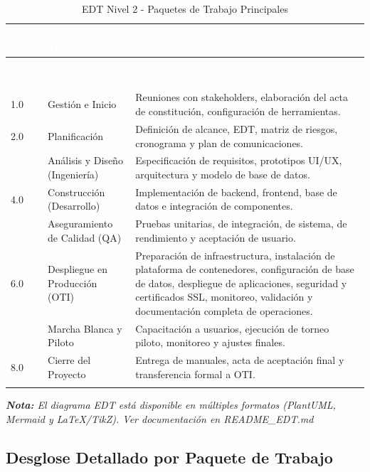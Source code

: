 \documentclass[12pt,a4paper]{article}
\begin{document}
\begin{longtable}{|>{\centering\arraybackslash}p{1.5cm}|>{\raggedright\arraybackslash}p{5cm}|>{\raggedright\arraybackslash}p{8cm}|}
\hline
\rowcolor{headercolor}
\textcolor{white}{\textbf{ID EDT}} & \textcolor{white}{\textbf{Paquete de Trabajo}} & \textcolor{white}{\textbf{Descripción}} \\
\hline
\endfirsthead
\hline
\rowcolor{headercolor}
\textcolor{white}{\textbf{ID EDT}} & \textcolor{white}{\textbf{Paquete de Trabajo}} & \textcolor{white}{\textbf{Descripción}} \\
\hline
\endhead
\hline
\endlastfoot

1.0 & Gestión e Inicio & Reuniones con stakeholders, elaboración del acta de constitución, configuración de herramientas. \\
\hline
\rowcolor{rowgray}
2.0 & Planificación & Definición de alcance, EDT, matriz de riesgos, cronograma y plan de comunicaciones. \\
\hline
3.0 & Análisis y Diseño (Ingeniería) & Especificación de requisitos, prototipos UI/UX, arquitectura y modelo de base de datos. \\
\hline
\rowcolor{rowgray}
4.0 & Construcción (Desarrollo) & Implementación de backend, frontend, base de datos e integración de componentes. \\
\hline
5.0 & Aseguramiento de Calidad (QA) & Pruebas unitarias, de integración, de sistema, de rendimiento y aceptación de usuario. \\
\hline
\rowcolor{rowgray}
6.0 & Despliegue en Producción (OTI) & Preparación de infraestructura, instalación de plataforma de contenedores, configuración de base de datos, despliegue de aplicaciones, seguridad y certificados SSL, monitoreo, validación y documentación completa de operaciones. \\
\hline
7.0 & Marcha Blanca y Piloto & Capacitación a usuarios, ejecución de torneo piloto, monitoreo y ajustes finales. \\
\hline
\rowcolor{rowgray}
8.0 & Cierre del Proyecto & Entrega de manuales, acta de aceptación final y transferencia formal a OTI. \\
\hline
\caption{EDT Nivel 2 - Paquetes de Trabajo Principales}
\end{longtable}

\noindent\textit{\textbf{Nota:} El diagrama EDT está disponible en múltiples formatos (PlantUML, Mermaid y LaTeX/TikZ). Ver documentación en README\_EDT.md}

\subsection{Desglose Detallado por Paquete de Trabajo}
\end{document}
